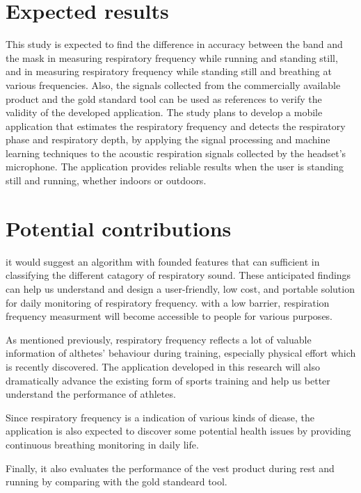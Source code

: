 \section{Expected results}
This study is expected to find the difference in accuracy between the band and the mask in measuring respiratory frequency while running and standing still, and in measuring respiratory frequency while standing still and breathing at various frequencies. Also, the signals collected from the commercially available product and the gold standard tool can be used as references to verify the validity of the developed application. The study plans to develop a mobile application that estimates the respiratory frequency and detects the respiratory phase and respiratory depth, by applying the signal processing and machine learning techniques to the acoustic respiration signals collected by the headset’s microphone. The application provides reliable results when the user is standing still and running, whether indoors or outdoors.
\section{Potential contributions}
it would suggest an algorithm with founded features that can sufficient in classifying the different catagory of respiratory sound. These anticipated findings can help us understand and design a user-friendly, low cost, and portable solution for daily monitoring of respiratory frequency. with a low barrier, respiration frequency measurment will become accessible to people for various purposes. 

As mentioned previously, respiratory frequency reflects a lot of valuable information of althetes’ behaviour during training, especially physical effort which is recently discovered. The application developed in this research will also dramatically advance the existing form of sports training and help us better understand the performance of athletes. 

Since respiratory frequency is a indication of various kinds of diease, the application is also expected to discover some potential health issues by providing continuous breathing monitoring in daily life. 

Finally, it also evaluates the performance of the vest product during rest and running by comparing with the gold standeard tool.
